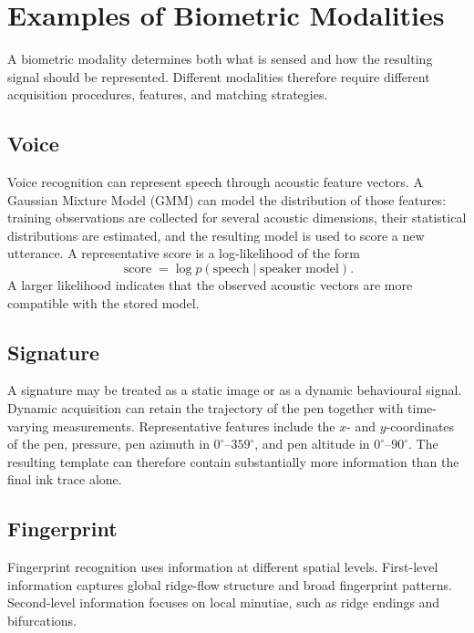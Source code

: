 \documentclass[11pt,a4paper,oneside]{report}
\begin{document}
\section{Examples of Biometric Modalities}
\label{subsec:modalities}

A biometric modality determines both what is sensed and how the resulting
signal should be represented. Different modalities therefore require
different acquisition procedures, features, and matching strategies.

\subsection{Voice}

Voice recognition can represent speech through acoustic feature vectors.
A Gaussian Mixture Model (GMM) can model the distribution of those features:
training observations are collected for several acoustic dimensions, their
statistical distributions are estimated, and the resulting model is used to
score a new utterance. A representative score is a log-likelihood of the
form
\[
    \operatorname{score}
    =
    \log p(\text{speech}\mid\text{speaker model}).
\]
A larger likelihood indicates that the observed acoustic vectors are more
compatible with the stored model.

\subsection{Signature}

A signature may be treated as a static image or as a dynamic behavioural
signal. Dynamic acquisition can retain the trajectory of the pen together
with time-varying measurements. Representative features include the
\(x\)- and \(y\)-coordinates of the pen, pressure, pen azimuth in
\(0^\circ\)--\(359^\circ\), and pen altitude in \(0^\circ\)--\(90^\circ\).
The resulting template can therefore contain substantially more information
than the final ink trace alone.

\subsection{Fingerprint}

Fingerprint recognition uses information at different spatial levels.
First-level information captures global ridge-flow structure and broad
fingerprint patterns. Second-level information focuses on local minutiae,
such as ridge endings and bifurcations.
\end{document}
